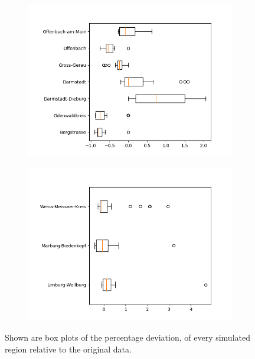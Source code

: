 \begin{figure}
\begin{subfigure}[b]{0.4\textwidth}
		\includegraphics[width=\textwidth]{./figures/76d/deviation_box76_alt3.png}	
	\end{subfigure}
	\begin{subfigure}[b]{0.4\textwidth}
		\centering
		\includegraphics[width=\textwidth]{./figures/76d/deviation_box76_alt4.png}	
	\end{subfigure}
	\caption{Shown are box plots of the percentage deviation, of every simulated region relative to the original data.}
	\label{fig:76_sim_box}
\end{figure}

